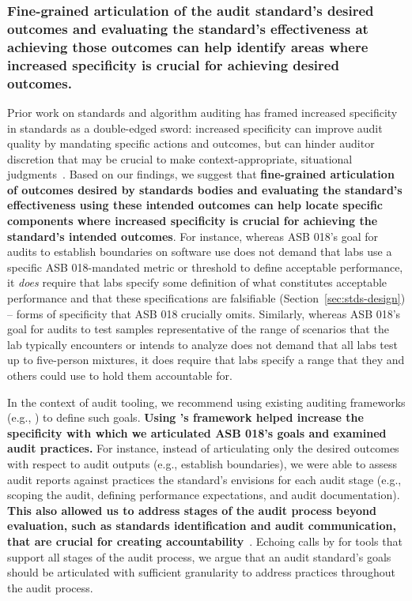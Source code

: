 \subsubsection{Fine-grained articulation of the audit standard’s desired outcomes and evaluating the standard’s effectiveness at achieving those outcomes can help identify areas where increased specificity is crucial for achieving desired outcomes.}
\label{sec:disc-design-artic}
Prior work on standards and algorithm auditing has framed increased specificity in standards as a double-edged sword: increased specificity can improve audit quality by mandating specific actions and outcomes, but can hinder auditor discretion that may be crucial to make context-appropriate, situational judgments~\cite{raji2022outsider, costanza2022audits, jackson2015standards}. Based on our findings, we suggest that \textbf{fine-grained articulation of outcomes desired by standards bodies and evaluating the standard’s effectiveness using these intended outcomes can help locate specific components where increased specificity is crucial for achieving the standard’s intended outcomes}. For instance, whereas ASB 018's goal for audits to establish boundaries on software use does not demand that labs use a specific ASB 018-mandated metric or threshold to define acceptable performance, it \textit{does} require that labs specify some definition of what constitutes acceptable performance and that these specifications are falsifiable (Section~\ref{sec:stds-design}) -- forms of specificity that ASB 018 crucially omits. Similarly, whereas ASB 018's goal for audits to test samples representative of the range of scenarios that the lab typically encounters or intends to analyze does not demand that all labs test up to five-person mixtures, it does require that labs specify a range that they and others could use to hold them accountable for.

In the context of audit tooling, we recommend using existing auditing frameworks (e.g., \cite{ojewale2025towards, raji2020closing, abebe2022adversarial, lam2024framework, radiya2023sociotechnical}) to define such goals. \textbf{Using \citet{ojewale2025towards}'s framework helped increase the specificity with which we articulated ASB 018’s goals and examined audit practices.} For instance, instead of articulating only the desired outcomes with respect to audit outputs (e.g., establish boundaries), we were able to assess audit reports against practices the standard’s envisions for each audit stage (e.g., scoping the audit, defining performance expectations, and audit documentation). \textbf{This also allowed us to address stages of the audit process beyond evaluation, such as standards identification and audit communication, that are crucial for creating accountability}~\cite{ojewale2025towards}. Echoing calls by \citet{ojewale2025towards} for tools that support all stages of the audit process, we argue that an audit standard’s goals should be articulated with sufficient granularity to address practices throughout the audit process. 


